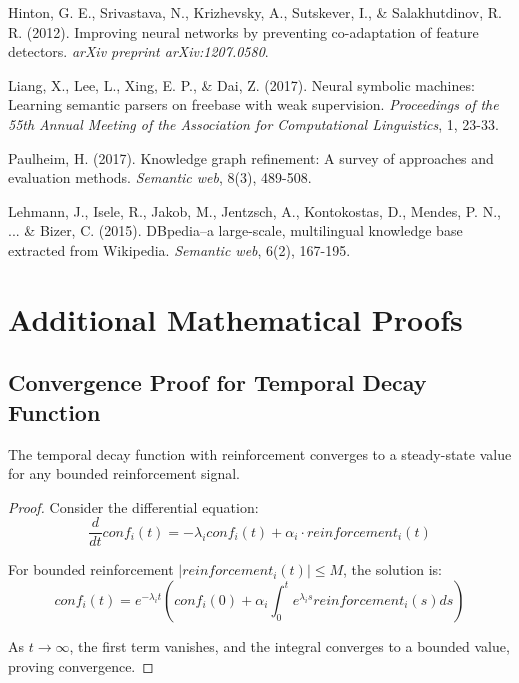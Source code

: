 \documentclass[12pt,a4paper]{article}
\begin{document}
\begin{thebibliography}{50}
Hinton, G. E., Srivastava, N., Krizhevsky, A., Sutskever, I., \& Salakhutdinov, R. R. (2012).
Improving neural networks by preventing co-adaptation of feature detectors.
\textit{arXiv preprint arXiv:1207.0580}.

Liang, X., Lee, L., Xing, E. P., \& Dai, Z. (2017).
Neural symbolic machines: Learning semantic parsers on freebase with weak supervision.
\textit{Proceedings of the 55th Annual Meeting of the Association for Computational Linguistics}, 1, 23-33.

Paulheim, H. (2017).
Knowledge graph refinement: A survey of approaches and evaluation methods.
\textit{Semantic web}, 8(3), 489-508.

Lehmann, J., Isele, R., Jakob, M., Jentzsch, A., Kontokostas, D., Mendes, P. N., ... \& Bizer, C. (2015).
DBpedia–a large-scale, multilingual knowledge base extracted from Wikipedia.
\textit{Semantic web}, 6(2), 167-195.

\end{thebibliography}

\appendix

\section{Additional Mathematical Proofs}

\subsection{Convergence Proof for Temporal Decay Function}

\begin{theorem}
The temporal decay function with reinforcement converges to a steady-state value for any bounded reinforcement signal.
\end{theorem}

\begin{proof}
Consider the differential equation:
\begin{equation}
\frac{d}{dt}conf_i(t) = -\lambda_i conf_i(t) + \alpha_i \cdot reinforcement_i(t)
\end{equation}

For bounded reinforcement $|reinforcement_i(t)| \leq M$, the solution is:
\begin{equation}
conf_i(t) = e^{-\lambda_i t}\left(conf_i(0) + \alpha_i \int_0^t e^{\lambda_i s} reinforcement_i(s) ds\right)
\end{equation}

As $t \to \infty$, the first term vanishes, and the integral converges to a bounded value, proving convergence.
\end{proof}
\end{document}
